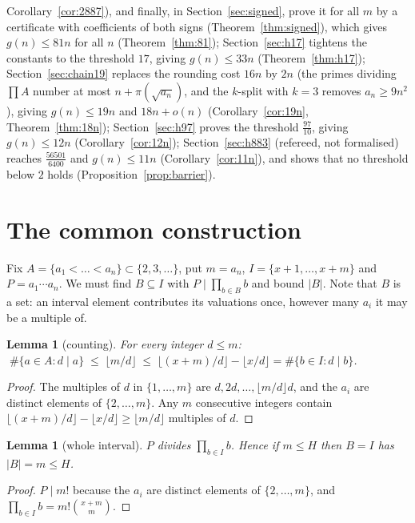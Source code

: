 \documentclass[11pt]{article}
\newtheorem{lemma}[theorem]{Lemma}
\theoremstyle{definition}
\begin{document}
Corollary~\ref{cor:2887}), and finally, in Section~\ref{sec:signed}, prove it for all $m$ by a certificate with coefficients of both signs
(Theorem~\ref{thm:signed}), which gives $g(n)\le81n$ for all $n$ (Theorem~\ref{thm:81}); Section~\ref{sec:h17} tightens the
constants to the threshold $17$, giving $g(n)\le33n$ (Theorem~\ref{thm:h17}); Section~\ref{sec:chain19} replaces the rounding cost $16n$ by
$2n$ (the primes dividing $\prod A$ number at most $n+\pi(\sqrt{a_n})$, and the $k$-split with $k=3$ removes $a_n\ge9n^2$), giving
$g(n)\le19n$ and $18n+o(n)$ (Corollary~\ref{cor:19n}, Theorem~\ref{thm:18n}); Section~\ref{sec:h97} proves the threshold $\tfrac{97}{10}$,
giving $g(n)\le12n$ (Corollary~\ref{cor:12n}); Section~\ref{sec:h883} (refereed, not formalised) reaches $\tfrac{56501}{6400}$ and
$g(n)\le11n$ (Corollary~\ref{cor:11n}), and shows that no threshold below $2$ holds (Proposition~\ref{prop:barrier}).

\section{The common construction}\label{sec:construction}

Fix $A=\{a_1<\dots<a_n\}\subset\{2,3,\dots\}$, put $m=a_n$, $I=\{x+1,\dots,x+m\}$ and $P=a_1\cdots a_n$.
We must find $B\subseteq I$ with $P\mid\prod_{b\in B}b$ and bound $|B|$. Note that $B$ is a set: an interval
element contributes its valuations once, however many $a_i$ it may be a multiple of.

\begin{lemma}[counting]\label{lem:count}
For every integer $d\le m$: $\;\#\{a\in A: d\mid a\}\;\le\;\lfloor m/d\rfloor\;\le\;\lfloor (x+m)/d\rfloor-\lfloor x/d\rfloor=\#\{b\in I: d\mid b\}$.
\end{lemma}
\begin{proof}
The multiples of $d$ in $\{1,\dots,m\}$ are $d,2d,\dots,\lfloor m/d\rfloor d$, and the $a_i$ are distinct
elements of $\{2,\dots,m\}$. Any $m$ consecutive integers contain
$\lfloor (x+m)/d\rfloor-\lfloor x/d\rfloor\ge\lfloor m/d\rfloor$ multiples of $d$.
\end{proof}

\begin{lemma}[whole interval]\label{lem:whole}
$P$ divides $\prod_{b\in I}b$. Hence if $m\le H$ then $B=I$ has $|B|=m\le H$.
\end{lemma}
\begin{proof}
$P\mid m!$ because the $a_i$ are distinct elements of $\{2,\dots,m\}$, and
$\prod_{b\in I}b=m!\binom{x+m}{m}$.
\end{proof}
\end{document}
